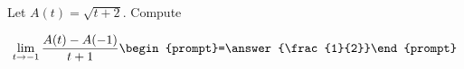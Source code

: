 \documentclass{ximera}
\author{Bart Snapp}
\begin{document}
\begin{exercise}
Let $A(t) = \sqrt{t+2}$. Compute

\[
\lim_{ t\to -1 } 
\frac{A(t)-A(-1)}{t+1} \begin{prompt}=\answer{\frac{1}{2}}\end{prompt}
\]
\end{exercise}
\end{document}
